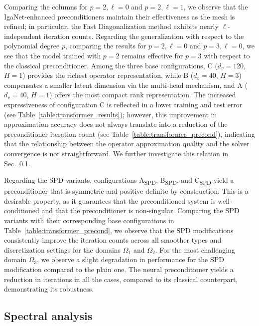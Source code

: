 \documentclass{article}
\newcommand{\Dlat}{d_v} %
\newcommand{\reflevel}{\ell} %
\theoremstyle{plain}
\numberwithin{equation}{section}
\begin{document}
Comparing the columns for $p=2, \reflevel=0$ and $p=2, \reflevel=1$, we observe that the IgaNet-enhanced preconditioners maintain their effectiveness as the mesh is refined; in particular, the Fast Diagonalization method exhibits nearly $\reflevel$-independent iteration counts.
Regarding the generalization with respect to the polynomial degree $p$, comparing the results for $p=2, \reflevel=0$ and $p=3, \reflevel=0$, we see that the model trained with $p=2$ remains effective for $p=3$ with respect to the classical preconditioner.
Among the three base configurations, C ($\Dlat=120$, $H=1$) provides the richest operator representation, while B ($\Dlat=40$, $H=3$) compensates a smaller latent dimension via the multi-head mechanism, and A ($\Dlat=40$, $H=1$) offers the most compact rank representation. The increased expressiveness of configuration C is reflected in a lower training and test error (see Table~\ref{table:transformer_results}); however, this improvement in approximation accuracy does not always translate into a reduction of the preconditioner iteration count (see Table~\ref{table:transformer_precond}), indicating that the relationship between the operator approximation quality and the solver convergence is not straightforward. We further investigate this relation in Sec.~\ref{sec:spectral_analysis}.

Regarding the SPD variants, configurations A\textsubscript{SPD}, B\textsubscript{SPD}, and C\textsubscript{SPD} yield a preconditioner that is symmetric and positive definite by construction. This is a desirable property, as it guarantees that the preconditioned system is well-conditioned and that the preconditioner is non-singular.
Comparing the SPD variants with their corresponding base configurations in Table~\ref{table:transformer_precond}, we observe that the SPD modifications consistently improve the iteration counts across all smoother types and discretization settings for the domains $\Omega_1$ and $\Omega_2$. For the most challenging domain $\Omega_3$, we observe a slight degradation in performance for the SPD modification compared to the plain one.
The neural preconditioner yields a reduction in iterations in all the cases, compared to its classical counterpart, demonstrating its robustness.

\subsection{Spectral analysis}
\label{sec:spectral_analysis}
\end{document}
